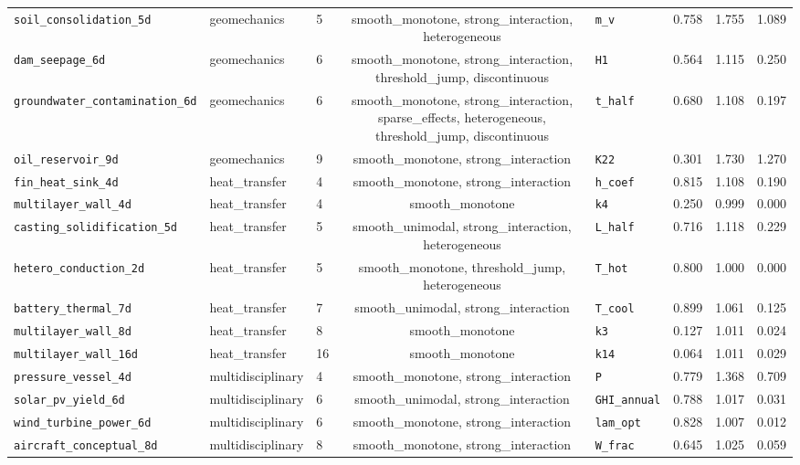 \begin{table}[htbp]
\begin{tabular}{@{}lllclrrr@{}}
\texttt{soil\_consolidation\_5d} & geomechanics & 5 & smooth\_monotone, strong\_interaction, heterogeneous & \texttt{m\_v} & 0.758 & 1.755 & 1.089 \\
\texttt{dam\_seepage\_6d} & geomechanics & 6 & smooth\_monotone, strong\_interaction, threshold\_jump, discontinuous & \texttt{H1} & 0.564 & 1.115 & 0.250 \\
\texttt{groundwater\_contamination\_6d} & geomechanics & 6 & smooth\_monotone, strong\_interaction, sparse\_effects, heterogeneous, threshold\_jump, discontinuous & \texttt{t\_half} & 0.680 & 1.108 & 0.197 \\
\texttt{oil\_reservoir\_9d} & geomechanics & 9 & smooth\_monotone, strong\_interaction & \texttt{K22} & 0.301 & 1.730 & 1.270 \\
\texttt{fin\_heat\_sink\_4d} & heat\_transfer & 4 & smooth\_monotone, strong\_interaction & \texttt{h\_coef} & 0.815 & 1.108 & 0.190 \\
\texttt{multilayer\_wall\_4d} & heat\_transfer & 4 & smooth\_monotone & \texttt{k4} & 0.250 & 0.999 & 0.000 \\
\texttt{casting\_solidification\_5d} & heat\_transfer & 5 & smooth\_unimodal, strong\_interaction, heterogeneous & \texttt{L\_half} & 0.716 & 1.118 & 0.229 \\
\texttt{hetero\_conduction\_2d} & heat\_transfer & 5 & smooth\_monotone, threshold\_jump, heterogeneous & \texttt{T\_hot} & 0.800 & 1.000 & 0.000 \\
\texttt{battery\_thermal\_7d} & heat\_transfer & 7 & smooth\_unimodal, strong\_interaction & \texttt{T\_cool} & 0.899 & 1.061 & 0.125 \\
\texttt{multilayer\_wall\_8d} & heat\_transfer & 8 & smooth\_monotone & \texttt{k3} & 0.127 & 1.011 & 0.024 \\
\texttt{multilayer\_wall\_16d} & heat\_transfer & 16 & smooth\_monotone & \texttt{k14} & 0.064 & 1.011 & 0.029 \\
\texttt{pressure\_vessel\_4d} & multidisciplinary & 4 & smooth\_monotone, strong\_interaction & \texttt{P} & 0.779 & 1.368 & 0.709 \\
\texttt{solar\_pv\_yield\_6d} & multidisciplinary & 6 & smooth\_unimodal, strong\_interaction & \texttt{GHI\_annual} & 0.788 & 1.017 & 0.031 \\
\texttt{wind\_turbine\_power\_6d} & multidisciplinary & 6 & smooth\_monotone, strong\_interaction & \texttt{lam\_opt} & 0.828 & 1.007 & 0.012 \\
\texttt{aircraft\_conceptual\_8d} & multidisciplinary & 8 & smooth\_monotone, strong\_interaction & \texttt{W\_frac} & 0.645 & 1.025 & 0.059 \\

\end{tabular}
\end{table}
